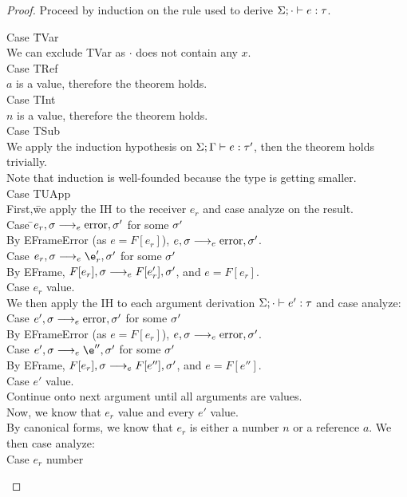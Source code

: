 \documentclass{report}
\begin{document}
\begin{proof}
Proceed by induction on the rule used to derive $\Sigma;\cdot \vdash e : \tau$.
\begin{tabbing}
Case \=TVar\\
\> We can exclude TVar as $\cdot$ does not contain any $x$.\\
Case TRef\\
\> $a$ is a value, therefore the theorem holds. \\
Case TInt\\
\> $n$ is a value, therefore the theorem holds. \\
Case TSub\\
\> We apply the induction hypothesis on $\Sigma;\Gamma\vdash e : \tau'$, then the theorem holds trivially.\\
\> Note that induction is well-founded because the type is getting smaller. \\
Case TUApp\\
\> First,\= we apply the IH to the receiver $e_r$ and case analyze on the result.\\
\> \> Case \=$e_r,\sigma \longrightarrow_{e} \text{error},\sigma'$ for some $\sigma'$\\
\> \> \> By EFrameError (as $e = F[e_r]$), $e,\sigma \longrightarrow_{e} \text{error},\sigma'$.\\
\> \> Case $e_r,\s \ereduce \e_r',\s'$ for some $\sigma'$\\
\> \> \> By EFrame, $F[e_r],\sigma \longrightarrow_{e} F[e_r'],\sigma'$, and $e = F[e_r]$.\\
\> \> Case $e_r$ value.\\
\> We then apply the IH to each argument derivation $\Sigma;\cdot \vdash e' : \tau$ and case analyze:\\
\> \> Case $e',\sigma \longrightarrow_{e} \text{error},\sigma'$ for some $\sigma'$\\
\> \> \> By EFrameError (as $e = F[e_r]$), $e,\sigma \longrightarrow_{e} \text{error},\sigma'$.\\
\> \> Case $e',\s \ereduce \e'',\s'$ for some $\sigma'$\\
\> \> \> By EFrame, $F[e_r],\sigma \longrightarrow_{e} F[e''],\sigma'$, and $e = F[e'']$.\\
\> \> Case $e'$ value.\\
\> \> \> Continue onto next argument until all arguments are values. \\
\> Now, we know that $e_r$ value and every $e'$ value.\\
\> By canonical forms, we know that $e_r$ is either a number $n$ or a reference $a$. We then case analyze:\\
\> \> Case $e_r$ number \\

\end{tabbing}
\end{proof}
\end{document}
